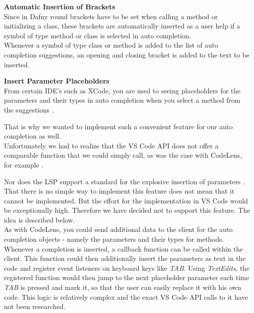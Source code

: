 
\textbf{Automatic Insertion of Brackets}\\
Since in Dafny round brackets have to be set when calling a method or initializing a class,
these brackets are automatically inserted as a user help
if a symbol of type method or class is selected in auto completion. \\

Whenever a symbol of type class or method is added to the list of auto completion suggestions,
an opening and closing bracket is added to the text to be inserted.


\textbf{Insert Parameter Placeholders}\\
From certain IDE's such as XCode,
you are used to seeing placeholders for the parameters and their types in auto completion
when you select a method from the suggestions \cite{sa}.

That is why we wanted to implement such a convenient feature for our auto completion as well. \\

Unfortunately we had to realize that the VS Code API
does not offer a comparable function that we could simply call,
as was the case with CodeLens, for example \cite{vscodeAPI}.

Nor does the LSP support a standard for the explosive insertion of parameters \cite{lspspec}. \\

That there is no simple way to implement this feature does not mean that it cannot be implemented.
But the effort for the implementation in VS Code would be exceptionally high.
Therefore we have decided not to support this feature.
The idea is described below. \\

As with CodeLens, you could send additional data to the client
for the auto completion objects - namely the parameters and their types for methods.
Whenever a completion is inserted, a callback function can be called within the client.
This function could then additionally insert the parameters as text in the code and register
event listeners on keyboard keys like \textit{TAB}.
Using \textit{TextEdits}, the registered function would then jump to the next placeholder parameter
each time \textit{TAB} is pressed and mark it, so that the user can easily replace it with his own code.
This logic is relatively complex and the exact VS Code API calls to it have not been researched. \\

